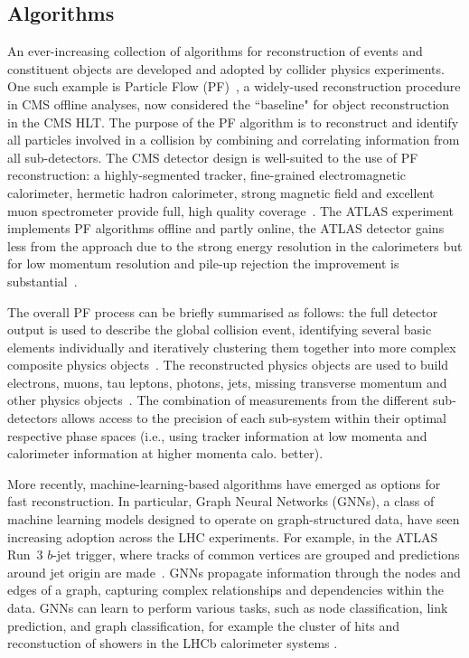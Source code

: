 \subsection{Algorithms} \label{sec:Algorithms}

An ever-increasing collection of algorithms for reconstruction of events and constituent objects are developed and adopted by collider physics experiments. One such example is Particle Flow (PF)~\cite{sirunyan2017pflowcms}, a widely-used reconstruction procedure in CMS offline analyses, now considered the ``baseline" for object reconstruction in the CMS HLT. The purpose of the PF algorithm is to reconstruct and identify all particles involved in a collision by combining and correlating information from all sub-detectors. The CMS detector design is well-suited to the use of PF reconstruction: a highly-segmented tracker, fine-grained electromagnetic calorimeter, hermetic hadron calorimeter, strong magnetic field and excellent muon spectrometer provide full, high quality coverage~\cite{sirunyan2017pflowcms}. The ATLAS experiment implements PF algorithms offline and partly online, the ATLAS detector gains less from the approach due to the strong energy resolution in the calorimeters but for low momentum resolution and pile-up rejection the improvement is substantial~\cite{ATLASTriggerRun3,ATLASJetPFlow}.

The overall PF process can be briefly summarised as follows: the full detector output is used to describe the global collision event, identifying several basic elements individually and iteratively clustering them together into more complex composite physics objects~\cite{CMS:2020uim,CMS:2018rym,CMS:2014pgm}. The reconstructed physics objects are used to build electrons, muons, tau leptons, photons, jets, missing transverse momentum and other physics objects~\cite{CMS:2018jrd,CMS:2016lmd,CMS:2019ctu}. The combination of measurements from the different sub-detectors allows access to the precision of each sub-system within their optimal respective phase spaces (i.e.,  using tracker information at low momenta and calorimeter information at higher momenta calo. better).

More recently, machine-learning-based algorithms have emerged as options for fast reconstruction. In particular, Graph Neural Networks (GNNs), a class of machine learning models designed to operate on graph-structured data, have seen increasing adoption across the LHC experiments. For example, in the ATLAS Run~3 $b$-jet trigger, where tracks of common vertices are grouped and predictions around jet origin are made~\cite{ATLASTriggerRun3}. GNNs propagate information through the nodes and edges of a graph, capturing complex relationships and dependencies within the data. GNNs can learn to perform various tasks, such as node classification, link prediction, and graph classification, for example the cluster of hits and reconstuction of showers in the LHCb calorimeter systems \cite{canudas2022graph}.

